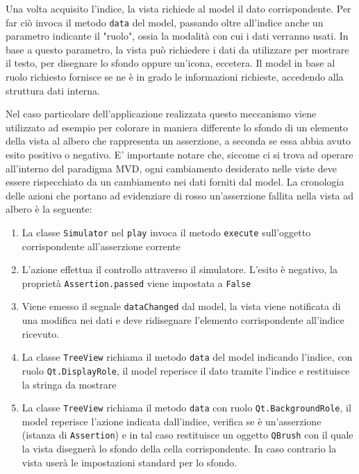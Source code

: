 Una volta acquisito l'indice, la vista richiede al model il dato corrispondente. Per far ciò invoca il metodo \verb|data| del model, passando oltre all'indice anche un parametro indicante il "ruolo", ossia la modalità con cui i dati verranno usati. In base a questo parametro, la vista può richiedere i dati da utilizzare per mostrare il testo, per disegnare lo sfondo oppure un'icona, eccetera. Il model in base al ruolo richiesto fornisce se ne è in grado le informazioni richieste, accedendo alla struttura dati interna. 

Nel caso particolare dell'applicazione realizzata questo meccanismo viene utilizzato ad esempio per colorare in maniera differente lo sfondo di un elemento della vista al albero che rappresenta un asserzione, a seconda se essa abbia avuto esito positivo o negativo. E' importante notare che, siccome ci si trova ad operare all'interno del paradigma MVD, ogni cambiamento desiderato nelle viste deve essere rispecchiato da un cambiamento nei dati forniti dal model. La cronologia delle azioni che portano ad evidenziare di rosso un'asserzione fallita nella vista ad albero è la seguente:

\begin{enumerate}
\item La classe \verb|Simulator| nel \verb|play| invoca il metodo \verb|execute| sull'oggetto corrispondente all'asserzione corrente
\item L'azione effettua il controllo attraverso il simulatore. L'esito è negativo, la proprietà \verb|Assertion.passed| viene impostata a \verb|False|
\item Viene emesso il segnale \verb|dataChanged| dal model, la vista viene notificata di una modifica nei dati e deve ridisegnare l'elemento corrispondente all'indice ricevuto.
\item La classe \verb|TreeView| richiama il metodo \verb|data| del model indicando l'indice, con ruolo \verb|Qt.DisplayRole|, il model reperisce il dato tramite l'indice e restituisce la stringa da mostrare
\item La classe \verb|TreeView| richiama il metodo \verb|data| con ruolo \verb|Qt.BackgroundRole|, il model reperisce l'azione indicata dall'indice, verifica se è un'asserzione (istanza di \verb|Assertion|) e in tal caso restituisce un oggetto \verb|QBrush| con il quale la vista disegnerà lo sfondo della cella corrispondente. In caso contrario la vista userà le impostazioni standard per lo sfondo.
\end{enumerate}

